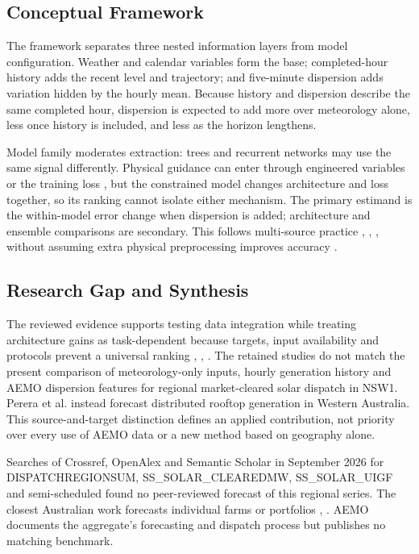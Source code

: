 \subsection{Conceptual Framework}

The framework separates three nested information layers from model configuration. Weather and calendar variables form the base; completed-hour history adds the recent level and trajectory; and five-minute dispersion adds variation hidden by the hourly mean. Because history and dispersion describe the same completed hour, dispersion is expected to add more over meteorology alone, less once history is included, and less as the horizon lengthens.

Model family moderates extraction: trees and recurrent networks may use the same signal differently. Physical guidance can enter through engineered variables or the training loss \cite{abdullah2026physics}, but the constrained model changes architecture and loss together, so its ranking cannot isolate either mechanism. The primary estimand is the within-model error change when dispersion is added; architecture and ensemble comparisons are secondary. This follows multi-source practice \cite{perera2024dayahead}, \cite{prasad2021prediction}, \cite{rabault2025datafusion}, \cite{wen2026multisource} without assuming extra physical preprocessing improves accuracy \cite{voyant2025clearsky}.

\subsection{Research Gap and Synthesis}

The reviewed evidence supports testing data integration while treating architecture gains as task-dependent because targets, input availability and protocols prevent a universal ranking \cite{perera2024dayahead}, \cite{scott2025transformers}, \cite{mollasalehi2025review}. The retained studies do not match the present comparison of meteorology-only inputs, hourly generation history and AEMO dispersion features for regional market-cleared solar dispatch in NSW1. Perera et al. \cite{perera2024dayahead} instead forecast distributed rooftop generation in Western Australia. This source-and-target distinction defines an applied contribution, not priority over every use of AEMO data or a new method based on geography alone.

Searches of Crossref, OpenAlex and Semantic Scholar in September 2026 for DISPATCHREGIONSUM, SS\_\allowbreak{}SOLAR\_\allowbreak{}CLEAREDMW, SS\_\allowbreak{}SOLAR\_\allowbreak{}UIGF and semi-scheduled found no peer-reviewed forecast of this regional series. The closest Australian work forecasts individual farms or portfolios \cite{boland2022forecasting}, \cite{farah2021time}. AEMO documents the aggregate's forecasting and dispatch process \cite{aemo2022handbook} but publishes no matching benchmark.

